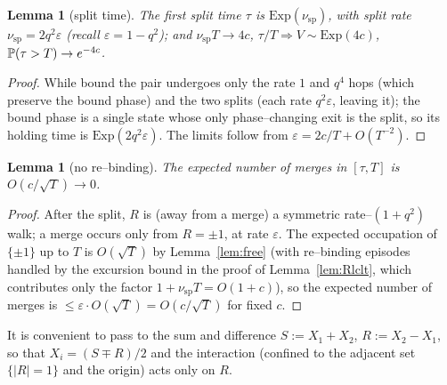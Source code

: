 \documentclass[11pt]{article}
\theoremstyle{plain}
\newtheorem{lemma}[theorem]{Lemma}
\theoremstyle{definition}
\theoremstyle{remark}
\newcommand{\To}{\Rightarrow}\newcommand{\so}{\mathfrak{so}}
\newcommand{\eps}{\varepsilon}\newcommand{\Exp}{\mathrm{Exp}}
\begin{document}
\begin{lemma}[split time]\label{lem:split}
The first split time $\tau$ is $\Exp(\nu_{\mathrm{sp}})$, with split rate
$\nu_{\mathrm{sp}}=2q^2\eps$ (recall $\eps=1-q^2$); and $\nu_{\mathrm{sp}}T\to4c$,
$\tau/T\To V\sim\Exp(4c)$, $\mathbb{P}(\tau>T)\to e^{-4c}$.
\end{lemma}
\begin{proof}
While bound the pair undergoes only the rate $1$ and $q^4$ hops (which preserve the
bound phase) and the two splits (each rate $q^2\eps$, leaving it); the bound phase is a
single state whose only phase--changing exit is the split, so its holding time is
$\Exp(2q^2\eps)$. The limits follow from $\eps=2c/T+O(T^{-2})$.
\end{proof}

\begin{lemma}[no re--binding]\label{lem:rebind}
The expected number of merges in $[\tau,T]$ is $O(c/\sqrt T)\to0$.
\end{lemma}
\begin{proof}
After the split, $R$ is (away from a merge) a symmetric rate--$(1+q^2)$ walk; a merge
occurs only from $R=\pm1$, at rate $\eps$. The expected occupation of $\{\pm1\}$ up to
$T$ is $O(\sqrt T)$ by Lemma~\ref{lem:free} (with re--binding episodes handled by the
excursion bound in the proof of Lemma~\ref{lem:Rlclt}, which contributes only the
factor $1+\nu_{\mathrm{sp}}T=O(1+c)$), so the expected number of merges is
$\le\eps\cdot O(\sqrt T)=O(c/\sqrt T)$ for fixed $c$.
\end{proof}

It is convenient to pass to the sum and difference $S:=X_1+X_2$, $R:=X_2-X_1$, so that
$X_i=(S\mp R)/2$ and the interaction (confined to the adjacent set $\{|R|=1\}$ and the
origin) acts only on $R$.
\end{document}
